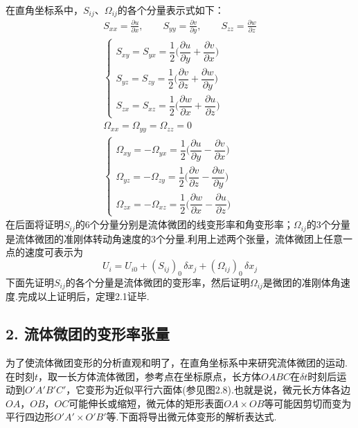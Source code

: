 在直角坐标系中，$S_{ij}$、$\Omega_{ij}$的各个分量表示式如下：
\begin{gather*}
S_{xx}=\frac{\partial u}{\partial x},\qquad S_{yy}=\frac{\partial v}{\partial y},\qquad S_{zz}=\frac{\partial w}{\partial z}\tag{2.21a}\\[4pt]
\begin{cases}
S_{xy}=S_{yx}=\dfrac{1}{2}\Big(\dfrac{\partial u}{\partial y}+\dfrac{\partial v}{\partial x}\Big)\\[6pt]
S_{yz}=S_{zy}=\dfrac{1}{2}\Big(\dfrac{\partial v}{\partial z}+\dfrac{\partial w}{\partial y}\Big)\\[6pt]
S_{zx}=S_{xz}=\dfrac{1}{2}\Big(\dfrac{\partial w}{\partial x}+\dfrac{\partial u}{\partial z}\Big)
\end{cases}\tag{2.21b}\\[10pt]
\Omega_{xx}=\Omega_{yy}=\Omega_{zz}=0\tag{2.22a}\\[4pt]
\begin{cases}
\Omega_{xy}=-\Omega_{yx}=\dfrac{1}{2}\Big(\dfrac{\partial u}{\partial y}-\dfrac{\partial v}{\partial x}\Big)\\[6pt]
\Omega_{yz}=-\Omega_{zy}=\dfrac{1}{2}\Big(\dfrac{\partial v}{\partial z}-\dfrac{\partial w}{\partial y}\Big)\\[6pt]
\Omega_{zx}=-\Omega_{xz}=\dfrac{1}{2}\Big(\dfrac{\partial w}{\partial x}-\dfrac{\partial u}{\partial z}\Big)
\end{cases}\tag{2.22b}
\end{gather*}
在后面将证明$S_{ij}$的6个分量分别是流体微团的线变形率和角变形率；$\Omega_{ij}$的3个分量是流体微团的准刚体转动角速度的3个分量.利用上述两个张量，流体微团上任意一点的速度可表示为
\begin{equation*}
U_i=U_{i0}+(S_{ij})_0\,\delta x_j+(\Omega_{ij})_0\,\delta x_j
\tag{2.23}
\end{equation*}
下面先证明$S_{ij}$的各个分量是流体微团的变形率，然后证明$\Omega_{ij}$是微团的准刚体角速度.完成以上证明后，定理2.1证毕.

\subsection*{2. 流体微团的变形率张量}

为了使流体微团变形的分析直观和明了，在直角坐标系中来研究流体微团的运动.在时刻$t$，取一长方体流体微团，参考点在坐标原点，长方体$OABC$在$\delta t$时刻后运动到$O'A'B'C'$，它变形为近似平行六面体(参见图2.8).也就是说，微元长方体各边$OA$，$OB$，$OC$可能伸长或缩短，微元体的矩形表面$OA\times OB$等可能因剪切而变为平行四边形$O'A'\times O'B'$等.下面将导出微元体变形的解析表达式.

